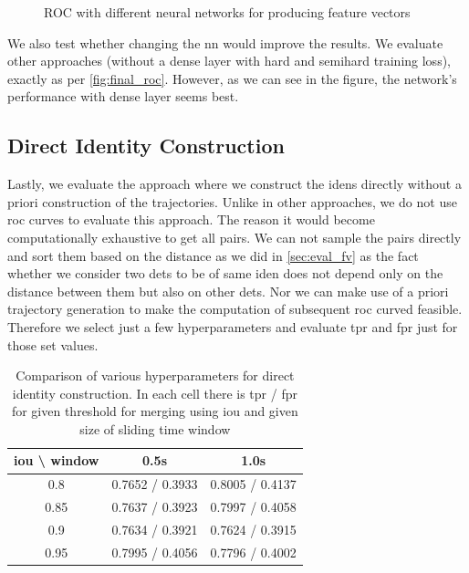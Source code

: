 \begin{figure}
    \centering
    \def\svgwidth{\columnwidth}
    {}
    \caption{ROC with different neural networks for producing feature vectors}
    \label{fig:final_nn}
\end{figure}

We also test whether changing the \gls{nn} would improve the results. We evaluate other approaches (without a dense layer with hard and semihard training loss), exactly as per \autoref{fig:final_roc}. However, as we can see in the figure, the network's performance with dense layer seems best.

\subsection{Direct Identity Construction}

Lastly, we evaluate the approach where we construct the \glspl{iden} directly without a priori construction of the trajectories. Unlike in other approaches, we do not use \gls{roc} curves to evaluate this approach. The reason it would become computationally exhaustive to get all pairs. We can not sample the pairs directly and sort them based on the distance as we did in \autoref{sec:eval_fv} as the fact whether we consider two \glspl{det} to be of same \gls{iden} does not depend only on the distance between them but also on other \glspl{det}. Nor we can make use of a priori trajectory generation to make the computation of subsequent \gls{roc} curved feasible. Therefore we select just a few hyperparameters and evaluate \gls{tpr} and \gls{fpr} just for those set values.

\begin{table}[]
    \centering
    \begin{tabular}{c||c|c}
     \gls{iou} \textbackslash{} window & 0.5s & 1.0s \\ \hline \hline
     0.8 & 0.7652 / 0.3933 & 0.8005 / 0.4137 \\ \hline
     0.85 & 0.7637 / 0.3923 & 0.7997 / 0.4058 \\ \hline
     0.9 & 0.7634 / 0.3921 & 0.7624 / 0.3915 \\ \hline
     0.95 & 0.7995 / 0.4056 & 0.7796 / 0.4002 
    \end{tabular}
    \caption[Comparison of various hyperparameters for direct identity construction]{Comparison of various hyperparameters for direct identity construction. In each cell there is \gls{tpr} / \gls{fpr} for given threshold for merging using \gls{iou} and given size of sliding time window}
    \label{tab:direct_param}
\end{table}

